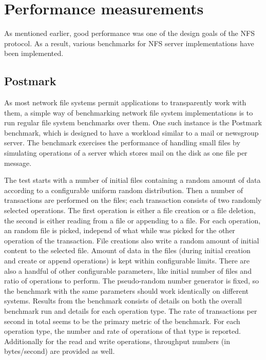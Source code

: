 \section{Performance measurements}

As mentioned earlier, good performance was one of the design goals of the NFS protocol.
As a result, various benchmarks for NFS server implementations have been implemented.

\subsection{Postmark}
As most network file systems permit applications to transparently work with them,
a simple way of benchmarking network file system implementations is to run regular file system benchmarks over them.
One such instance is the Postmark benchmark, which is designed to have a workload similar to a mail or newsgroup server.
The benchmark exercises the performance of handling small files by simulating operations of a server which
stores mail on the disk as one file per message.

The test starts with a number of initial files containing a random amount of data according to a configurable uniform random distribution.
Then a number of transactions are performed on the files; each transaction consists of two randomly selected operations.
The first operation is either a file creation or a file deletion, the second is either reading from a file or appending to a file.
For each operation, an random file is picked, independ of what while was picked for the other operation of the transaction.
File creations also write a random amount of initial content to the selected file.
Amount of data in the files (during initial creation and create or append operations) is kept within configurable limits.
There are also a handful of other configurable parameters, like initial number of files and ratio of operations to perform.
The pseudo-random number generator is fixed, so the benchmark with the same parameters should work identically on different systems.
Results from the benchmark consists of details on both the overall benchmark run and details for each operation type.
The rate of transactions per second in total seems to be the primary metric of the benchmark.
For each operation type, the number and rate of operations of that type is reported.
Additionally for the read and write operations, throughput numbers (in bytes/second) are provided as well.

